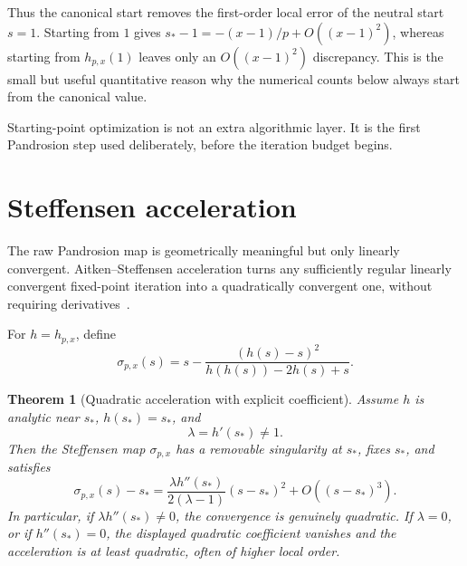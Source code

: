 \documentclass[10pt,a4paper]{article}
\theoremstyle{plain}
\newtheorem{theorem}{Theorem}[section]
\theoremstyle{definition}
\theoremstyle{remark}
\newcommand{\hp}{h_{p,x}}
\newcommand{\stef}{\sigma_{p,x}}
\newenvironment{takeaway}{%
  \begin{center}\begin{minipage}{0.92\linewidth}\small\itshape\color{blue!45!black}%
}{%
  \end{minipage}\end{center}%
}
\begin{document}
Thus the canonical start removes the first-order local error of the neutral
start $s=1$.  Starting from $1$ gives
$s_*-1=-(x-1)/p+O((x-1)^2)$, whereas starting from $h_{p,x}(1)$ leaves only an
$O((x-1)^2)$ discrepancy.  This is the small but useful quantitative reason why
the numerical counts below always start from the canonical value.

\begin{takeaway}
Starting-point optimization is not an extra algorithmic layer.  It is the first
Pandrosion step used deliberately, before the iteration budget begins.
\end{takeaway}

\section{Steffensen acceleration}
\label{sec:steffensen}

The raw Pandrosion map is geometrically meaningful but only linearly
convergent.  Aitken--Steffensen acceleration turns any sufficiently regular
linearly convergent fixed-point iteration into a quadratically convergent one,
without requiring derivatives~\cite{aitken,steffensen,ostrowski}.

For $h=\hp$, define
\begin{equation}
  \stef(s)
  =s-\frac{(h(s)-s)^2}{h(h(s))-2h(s)+s}.
  \label{eq:steffensen}
\end{equation}

\begin{theorem}[Quadratic acceleration with explicit coefficient]
\label{thm:steffensen-explicit}
Assume $h$ is analytic near $s_*$, $h(s_*)=s_*$, and
\[
  \lambda=h'(s_*)\ne 1.
\]
Then the Steffensen map $\stef$ has a removable singularity at $s_*$, fixes
$s_*$, and satisfies
\begin{equation}
  \stef(s)-s_*
  =\frac{\lambda h''(s_*)}{2(\lambda-1)}(s-s_*)^2
  +O((s-s_*)^3).
  \label{eq:steffensen-constant}
\end{equation}
In particular, if $\lambda h''(s_*)\ne0$, the convergence is genuinely
quadratic.  If $\lambda=0$, or if $h''(s_*)=0$, the displayed quadratic coefficient
vanishes and the acceleration is at least quadratic, often of higher local order.
\end{theorem}
\end{document}

